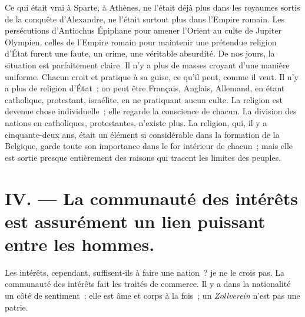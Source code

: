\documentclass[french,twoside]{book} %
\newcommand\persName[1]{#1}
\newcommand\placeName[1]{#1}
\begin{document}
Ce qui était vrai à {\placeName Sparte}, à {\placeName Athènes}, ne l’était déjà plus dans les royaumes sortis de la conquête d’{\persName Alexandre}, ne l’était surtout plus dans l’{\placeName Empire romain}. Les persécutions d’{\persName Antiochus Épiphane} pour amener l’{\placeName Orient} au culte de {\persName Jupiter Olympien}, celles de l’{\placeName Empire romain} pour maintenir une prétendue religion d’État furent une faute, un crime, une véritable absurdité. De nos jours, la situation est parfaitement claire. Il n’y a plus de masses croyant d’une manière uniforme. Chacun croit et pratique à sa guise, ce qu’il peut, comme il veut. Il n’y a plus de religion d’État ; on peut être Français, Anglais, Allemand, en étant catholique, protestant, israélite, en ne pratiquant aucun culte. La religion est devenue chose individuelle ; elle regarde la conscience de chacun. La division des nations en catholiques, protestantes, n’existe plus. La religion, qui, il y a cinquante-deux ans, était un élément si considérable dans la formation de la {\placeName Belgique}, garde toute son importance dans le for intérieur de chacun ; mais elle est sortie presque entièrement des raisons qui tracent les limites des peuples.
\section[{IV. — La communauté des intérêts est assurément un lien puissant entre les hommes.}]{IV. — La communauté des intérêts est assurément un lien puissant entre les hommes.}
\noindent Les intérêts, cependant, suffisent-ils à faire une nation ? je ne le crois pas. La communauté des intérêts fait les traités de commerce. Il y a dans la nationalité un côté de sentiment ; elle est âme et corps à la fois ; un {\itshape Zollverein} n’est pas une patrie.
\end{document}
